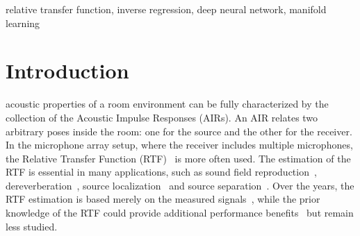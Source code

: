 \documentclass[journal]{IEEEtran}
\begin{document}
\begin{IEEEkeywords}
relative transfer function, inverse regression, deep neural network, manifold learning
\end{IEEEkeywords}

%
\IEEEpeerreviewmaketitle


\section{Introduction}


 acoustic properties of a room environment can be fully characterized by the collection of the Acoustic Impulse Responses (AIRs). An AIR relates two arbitrary poses inside the room: one for the source and the other for the receiver. In the microphone array setup, where the receiver includes multiple microphones, the Relative Transfer Function (RTF)~\cite{gannot2001signal} is more often used. The estimation of the RTF is essential in many applications, such as sound field reproduction~\cite{betlehem2005theory}, dereverberation~\cite{lin2007blind}, source localization~\cite{li2015estimation} and source separation~\cite{koldovsky2015spatial}. Over the years, the RTF estimation is based merely on the measured signals~\cite{cohen2004relative,talmon2009relative,taseska2015relative}, while the prior knowledge of the RTF could provide additional performance benefits~\cite{talmon2013relative} but remain less studied.
\end{document}
